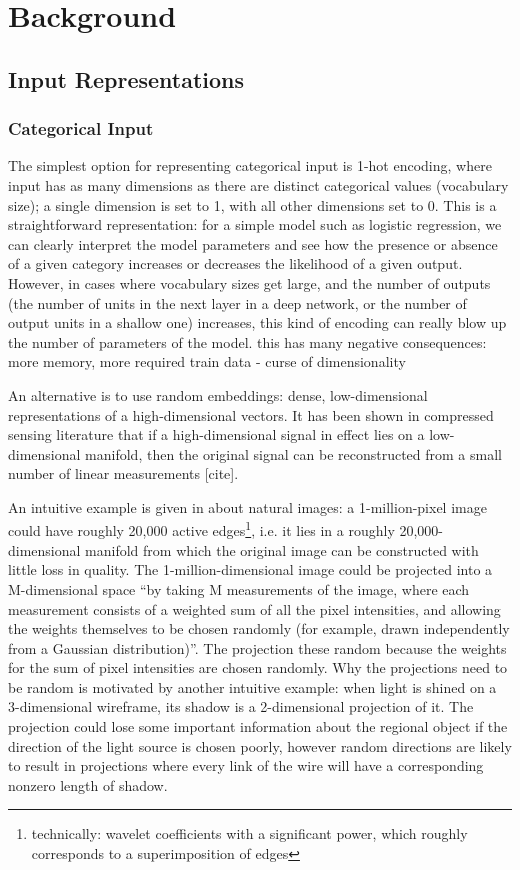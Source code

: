 \chapter{Background}


\section{Input Representations}
\label{data_rep}

\subsection{Categorical Input}

The simplest option for representing categorical input is 1-hot encoding, where input has as many dimensions as there are distinct categorical values (vocabulary size); a single dimension is set to 1, with all other dimensions set to 0.
This is a straightforward representation: for a simple model such as logistic regression, we can clearly interpret the model parameters and see how the presence or absence of a given category increases or decreases the likelihood of a given output.
However, in cases where vocabulary sizes get  large, and the number of outputs (the number of units in the next layer in a deep network,  or the number of output units  in a shallow one) increases, this kind of encoding can really blow up the number of parameters of the model.
 this has many negative consequences: more memory, more required train data - curse of dimensionality

An alternative is to use  random embeddings:  dense, low-dimensional representations of a high-dimensional vectors.
It has been shown in compressed sensing literature that if a high-dimensional signal in effect lies on a low-dimensional manifold, then the original signal can be reconstructed from a small number of linear measurements [cite].

An intuitive example is given in \cite{} about natural images: a 1-million-pixel image could have roughly 20,000 active edges\footnote{technically: wavelet coefficients with a significant power, which roughly corresponds to a superimposition of edges}, i.e. it lies in a roughly 20,000-dimensional manifold from which the original image can be constructed with little loss in quality.
The 1-million-dimensional image could be projected into a M-dimensional space ``by taking M measurements of the image, where each measurement consists of a weighted sum of all the pixel intensities, and allowing the weights themselves to be chosen randomly (for example, drawn independently from a Gaussian distribution)''.
The projection these random because the weights for the sum of pixel intensities are chosen randomly.
Why the projections need to be random is motivated by another intuitive example:  when light is shined on a 3-dimensional wireframe, its shadow is a 2-dimensional projection of it.
The projection could lose some important information about the regional object if the direction of the light source is chosen poorly,  however random directions are likely to result in projections where every link of the wire will have a corresponding nonzero length of shadow.

